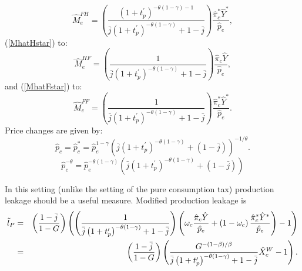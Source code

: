 \documentclass[notitlepage,12pt]{article}
\begin{document}
\begin{equation*}
\hat{M}_{e}^{FH}=\left( \frac{\left( 1+t_{p}^{\prime }\right) ^{-\theta
\left( 1-\gamma \right) -1}}{\bar{j}\left( 1+t_{p}^{\prime }\right)
^{-\theta \left( 1-\gamma \right) }+1-\bar{j}}\right) \frac{\hat{\pi}%
_{c}^{\ast }\hat{Y}^{\ast }}{\hat{p}_{e}},
\end{equation*}%
(\ref{MhatHstar}) to:%
\begin{equation*}
\hat{M}_{e}^{HF}=\left( \frac{1}{\bar{j}\left( 1+t_{p}^{\prime }\right)
^{-\theta \left( 1-\gamma \right) }+1-\bar{j}}\right) \frac{\hat{\pi}_{c}%
\hat{Y}}{\hat{p}_{e}},
\end{equation*}%
and (\ref{MhatFstar}) to:%
\begin{equation*}
\hat{M}_{e}^{FF}=\left( \frac{1}{\bar{j}\left( 1+t_{p}^{\prime }\right)
^{-\theta \left( 1-\gamma \right) }+1-\bar{j}}\right) \frac{\hat{\pi}%
_{c}^{\ast }\hat{Y}^{\ast }}{\hat{p}_{e}}.
\end{equation*}%
Price changes are given by:%
\begin{equation*}
\hat{p}_{c}=\hat{p}_{c}^{\ast }=\hat{p}_{e}^{1-\gamma }\left( \bar{j}\left(
1+t_{p}^{\prime }\right) ^{-\theta \left( 1-\gamma \right) }+\left( 1-\bar{j}%
\right) \right) ^{-1/\theta }.
\end{equation*}%
\begin{equation*}
\hat{p}_{c}^{-\theta }=\hat{p}_{e}^{-\theta \left( 1-\gamma \right) }\left( 
\bar{j}\left( 1+t_{p}^{\prime }\right) ^{-\theta \left( 1-\gamma \right)
}+\left( 1-\bar{j}\right) \right) 
\end{equation*}

In this setting (unlike the setting of the pure consumption tax) production
leakage should be a useful measure. Modified production leakage is%
\begin{eqnarray*}
\tilde{l}_{P} &=&\left( \frac{1-\bar{j}}{1-G}\right) \left( \left( \frac{1}{%
\bar{j}\left( 1+t_{p}^{\prime }\right) ^{-\theta \left( 1-\gamma \right) }+1-%
\bar{j}}\right) \left( \omega _{c}\frac{\hat{\pi}_{c}\hat{Y}}{\hat{p}_{e}}%
+\left( 1-\omega _{c}\right) \frac{\hat{\pi}_{c}^{\ast }\hat{Y}^{\ast }}{%
\hat{p}_{e}}\right) -1\right)  \\
&=&\left( \frac{1-\bar{j}}{1-G}\right) \left( \frac{G^{-\left( 1-\beta
\right) /\beta }}{\bar{j}\left( 1+t_{p}^{\prime }\right) ^{-\theta \left(
1-\gamma \right) }+1-\bar{j}}\hat{X}_{c}^{W}-1\right) .
\end{eqnarray*}
\end{document}
